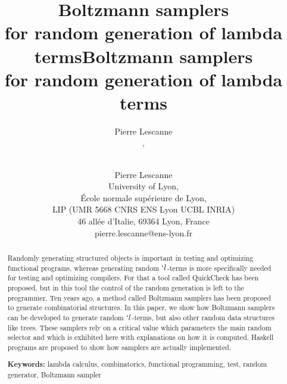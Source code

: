 \documentclass{sig-alternate}
\begin{document}
\ifICFP {}


\title{Boltzmann samplers \\for random generation of lambda terms} 


 \author{ \alignauthor
  Pierre Lescanne\\
  , \\
   \\
  }
\else
\author{Pierre Lescanne\\
   University of Lyon, \\
  {\'Ecole normale sup\'erieure de Lyon,} \\
  {LIP (UMR 5668 CNRS ENS Lyon UCBL INRIA)}\\
    {46 all\'ee d'Italie, 69364 Lyon, France}\\
    \textsf{pierre.lescanne@ens-lyon.fr} }
\title{Boltzmann samplers \\for random generation of lambda terms} 
\fi
\maketitle
\begin{abstract}
  \begin{sloppypar}
    Randomly generating structured objects is important in testing and optimizing
    functional programs, whereas generating random $`l$-terms is more specifically
    needed for testing and optimizing compilers.  For that a tool called
    \textsf{QuickCheck} has been proposed, but in this tool the
    control of the random generation is left to the programmer.  Ten years ago, a
    method called Boltzmann samplers has been proposed to generate combinatorial
    structures.  In this paper, we show how Boltzmann samplers can be developed to
    generate random \mbox{$`l$-terms}, but also other random data structures like trees.  These
    samplers rely on a critical value which parameters the main random selector and
    which is exhibited here with explanations on how it is computed.
    \textsf{Haskell} programs are proposed to show how samplers are actually
    implemented.
  \end{sloppypar}

\ifICFP\else 
\noindent\textbf{Keywords: } lambda calculus, combinatorics, functional programming,
  test, random generator, Boltzmann sampler \fi
\end{abstract}
\end{document}

